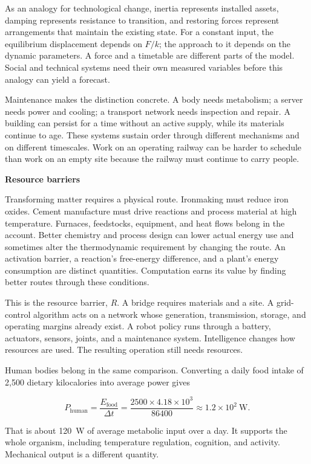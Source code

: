 \documentclass[11pt,openany]{book}
\newcommand{\subhead}[1]{\par\medskip\noindent\textbf{#1}\par\nobreak\smallskip}
\begin{document}
As an analogy for technological change, inertia represents installed assets, damping represents resistance to transition, and restoring forces represent arrangements that maintain the existing state. For a constant input, the equilibrium displacement depends on $F/k$; the approach to it depends on the dynamic parameters. A force and a timetable are different parts of the model. Social and technical systems need their own measured variables before this analogy can yield a forecast.

Maintenance makes the distinction concrete. A body needs metabolism; a server needs power and cooling; a transport network needs inspection and repair. A building can persist for a time without an active supply, while its materials continue to age. These systems sustain order through different mechanisms and on different timescales. Work on an operating railway can be harder to schedule than work on an empty site because the railway must continue to carry people.

\subhead{Resource barriers}

Transforming matter requires a physical route. Ironmaking must reduce iron oxides. Cement manufacture must drive reactions and process material at high temperature. Furnaces, feedstocks, equipment, and heat flows belong in the account. Better chemistry and process design can lower actual energy use and sometimes alter the thermodynamic requirement by changing the route. An activation barrier, a reaction's free-energy difference, and a plant's energy consumption are distinct quantities. Computation earns its value by finding better routes through these conditions.

This is the resource barrier, $R$. A bridge requires materials and a site. A grid-control algorithm acts on a network whose generation, transmission, storage, and operating margins already exist. A robot policy runs through a battery, actuators, sensors, joints, and a maintenance system. Intelligence changes how resources are used. The resulting operation still needs resources.

Human bodies belong in the same comparison. Converting a daily food intake of 2,500 dietary kilocalories into average power gives

\begin{equation}
P_{\mathrm{human}}
=\frac{E_{\mathrm{food}}}{\Delta t}
=\frac{2500\times4.18\times10^3}{86400}
\approx1.2\times10^2\ \mathrm{W}.
\end{equation}

That is about 120~W of average metabolic input over a day. It supports the whole organism, including temperature regulation, cognition, and activity. Mechanical output is a different quantity.
\end{document}

